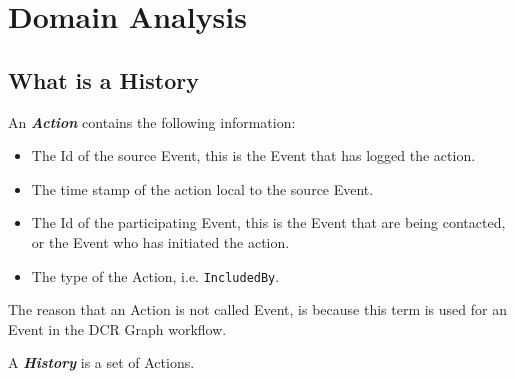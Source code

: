 \chapter{Domain Analysis}
\label{chap:domainanalysis}

\section{What is a History}
\begin{definition}
	An \textit{\textbf{Action}} contains the following information:
	\begin{itemize}
		\item The Id of the source Event, this is the Event that has logged the action.
		\item The time stamp of the action local to the source Event.
		\item The Id of the participating Event, this is the Event that are being contacted, or the Event who has initiated the action.
		\item The type of the Action, i.e. \texttt{IncludedBy}.
	\end{itemize}
	
	The reason that an Action is not called Event, is because this term is used for an Event in the DCR Graph workflow.
\end{definition}

\begin{definition}\label{definition:historya}
	A \textit{\textbf{History}} is a set of Actions.
\end{definition}

